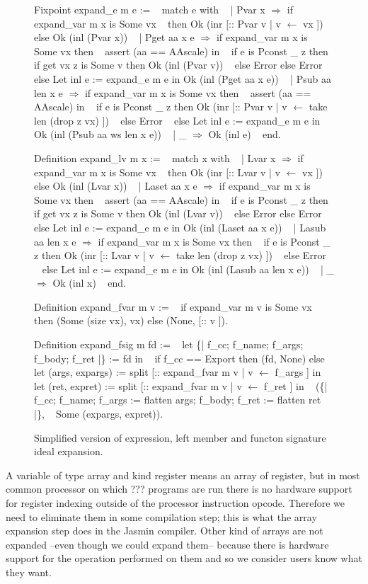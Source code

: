 \documentclass{article}
\begin{document}
\begin{figure}[p]
\obeylines\obeyspaces\ttfamily%
Fixpoint expand\_e m e := 
~ match e with
~ | Pvar x \(\Rightarrow\) if expand\_var m x is Some vx
~   then Ok (inr [:: Pvar v | v \(\leftarrow\) vx ]) else Ok (inl (Pvar x))
~ | Pget aa x e \(\Rightarrow\) if expand\_var m x is Some vx then
~     assert (aa == AAscale) in
~     if e is Pconst \_ z then if get vx z is Some v then Ok (inl (Pvar v))
~     else Error else Error
~   else Let inl e := expand\_e m e in Ok (inl (Pget aa x e))
~ | Psub aa len x e \(\Rightarrow\) if expand\_var m x is Some vx then
~     assert (aa == AAscale) in
~     if e is Pconst \_ z then Ok (inr [:: Pvar v | v \(\leftarrow\) take len (drop z vx) ])
~     else Error
~   else Let inl e := expand\_e m e in Ok (inl (Psub aa ws len x e))
~ | \_ \(\Rightarrow\) Ok (inl e)
~ end.

Definition expand\_lv m x :=
~ match x with
~ | Lvar x \(\Rightarrow\) if expand\_var m x is Some vx
~   then Ok (inr [:: Lvar v | v \(\leftarrow\) vx ]) else Ok (inl (Lvar x))
~ | Laset aa x e \(\Rightarrow\) if expand\_var m x is Some vx then
~     assert (aa == AAscale) in
~     if e is Pconst \_ z then if get vx z is Some v then Ok (inl (Lvar v))
~     else Error else Error
~   else Let inl e := expand\_e m e in Ok (inl (Laset aa x e))
~ | Lasub aa len x e \(\Rightarrow\) if expand\_var m x is Some vx then
~     if e is Pconst \_ z then Ok (inr [:: Lvar v | v \(\leftarrow\) take len (drop z vx) ])
~     else Error
~   else Let inl e := expand\_e m e in Ok (inl (Lasub aa len x e))
~ | \_ \(\Rightarrow\) Ok (inl x)
~ end.

Definition expand\_fvar m v :=
~ if expand\_var m v is Some vx then (Some (size vx), vx) else (None, [:: v ]).

Definition expand\_fsig m fd :=
~ let \{| f\_cc; f\_name; f\_args; f\_body; f\_ret |\} := fd in
~ if f\_cc == Export then (fd, None) else
~ let (args, expargs) := split [:: expand\_fvar m v | v \(\leftarrow\) f\_args ] in
~ let (ret,  expret)  := split [:: expand\_fvar m v | v \(\leftarrow\) f\_ret  ] in
~ (\{| f\_cc; f\_name; f\_args := flatten args; f\_body; f\_ret := flatten ret |\},
~   Some (expargs, expret)).
\normalfont%
\caption{Simplified version of expression, left member and functon signature ideal expansion.}
\end{figure}

A variable of type array and kind register means an array of register, but in
most common processor on which ??? programs are run there is no hardware support
for register indexing outside of the processor instruction opcode. Therefore we
need to eliminate them in some compilation step; this is what the array
expansion step does in the Jasmin compiler. Other kind of arrays are not
expanded --even though we could expand them-- because there is hardware support
for the operation performed on them and so we consider users know what they want.
\end{document}
